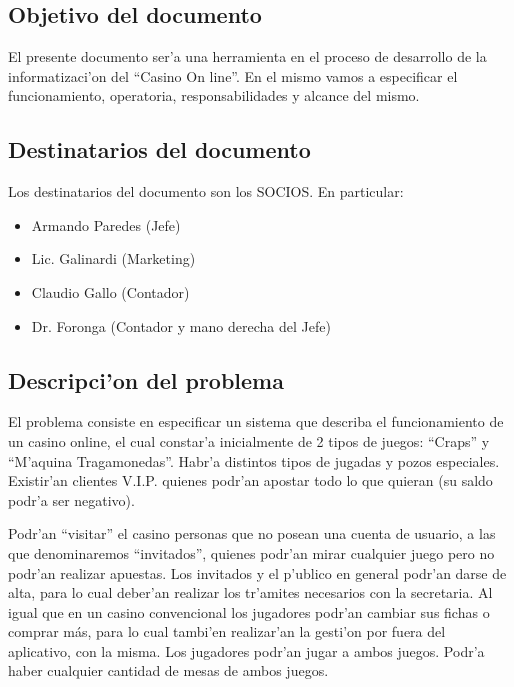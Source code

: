 \subsection{ Objetivo del documento }

El presente documento ser'a una herramienta en el proceso 
de desarrollo de la informatizaci'on del ``Casino On line''. En el mismo 
vamos a especificar el funcionamiento, operatoria, responsabilidades y alcance
del mismo.



\subsection{ Destinatarios del documento	}
Los destinatarios del documento son los SOCIOS. En particular:

\begin{itemize}
    \item Armando Paredes (Jefe)
    \item Lic. Galinardi (Marketing)
    \item Claudio Gallo (Contador)
    \item Dr. Foronga (Contador y mano derecha del Jefe)
\end{itemize}


\subsection{ Descripci'on del problema }
El problema consiste en especificar un sistema que describa el funcionamiento
de un casino online, el cual constar'a inicialmente de 2 tipos de juegos: ``Craps'' y ``M'aquina Tragamonedas''. Habr'a distintos tipos de jugadas y pozos especiales. Existir'an clientes V.I.P. quienes podr'an apostar todo lo que quieran (su saldo podr'a ser negativo).

 Podr'an ``visitar'' el casino personas que no posean una cuenta de usuario, a las que denominaremos ``invitados'', quienes podr'an mirar cualquier juego pero no podr'an realizar apuestas. Los invitados y el p'ublico en general podr'an darse de alta, para lo cual deber'an realizar los tr'amites necesarios con la secretaria. 
Al igual que en un casino convencional los jugadores podr'an cambiar sus fichas o comprar más, para lo cual tambi'en realizar'an la gesti'on por fuera del aplicativo, con la misma.
Los jugadores podr'an jugar a ambos juegos. Podr'a haber cualquier cantidad de mesas de ambos
juegos.


